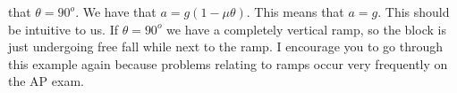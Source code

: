 that $\theta=90^o $. We have that $a=g\left(1-\mu \theta \right)$. This means that $a=g$. This should be intuitive to us. If $\theta=90^o$ we have a completely vertical ramp, so the block is just undergoing free fall while next to the ramp. I encourage you to go through this example again because problems relating to ramps occur very frequently on the AP exam. 
